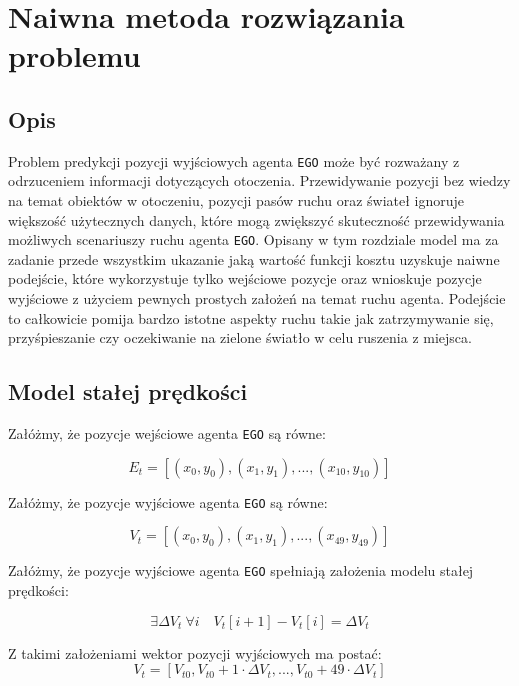 \chapter{Naiwna metoda rozwiązania problemu}
\thispagestyle{chapterBeginStyle}

\section{Opis}

Problem predykcji pozycji wyjściowych agenta \texttt{EGO} może być rozważany z odrzuceniem informacji dotyczących otoczenia. Przewidywanie pozycji bez wiedzy na temat obiektów w otoczeniu, pozycji pasów ruchu oraz świateł ignoruje większość użytecznych danych, które mogą zwiększyć skuteczność przewidywania możliwych scenariuszy ruchu agenta \texttt{EGO}. Opisany w tym rozdziale model ma za zadanie przede wszystkim ukazanie jaką wartość funkcji kosztu uzyskuje naiwne podejście, które wykorzystuje tylko wejściowe pozycje oraz wnioskuje pozycje wyjściowe z użyciem pewnych prostych założeń na temat ruchu agenta. Podejście to całkowicie pomija bardzo istotne aspekty ruchu takie jak zatrzymywanie się, przyśpieszanie czy oczekiwanie na zielone światło w celu ruszenia z miejsca.

\section{Model stałej prędkości}

\noindent
Załóżmy, że pozycje wejściowe agenta \texttt{EGO} są równe:

\begin{equation}
E_{t} = [(x_{0},y_{0}), (x_{1},y_{1}), ... , (x_{10},y_{10})]
\end{equation}

\noindent
Załóżmy, że pozycje wyjściowe agenta \texttt{EGO} są równe:

\begin{equation}
V_{t} = [(x_{0},y_{0}), (x_{1},y_{1}), ... , (x_{49},y_{49})]
\end{equation}

\noindent
Załóżmy, że pozycje wyjściowe agenta \texttt{EGO} spełniają założenia modelu stałej prędkości:

\begin{equation}
\exists\Delta V_{t}\:\forall i \quad V_{t}[i+1] - V_{t}[i] = \Delta V_{t}
\end{equation}

\noindent
Z takimi założeniami wektor pozycji wyjściowych ma postać:
\begin{equation}
V_{t} = [V_{t0}, V_{t0} + 1\cdot\Delta V_{t}, ... , V_{t0} + 49\cdot\Delta V_{t}]
\end{equation}

